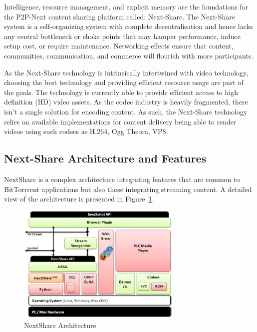 Intelligence, resource management, and explicit memory are the foundations for
the P2P-Next content sharing platform called: Next-Share. The Next-Share
system is a self-organizing system with complete decentralisation and hence
lacks any central bottleneck or choke points that may hamper performance,
induce setup cost, or require maintenance. Networking effects ensure that
content, communities, communication, and commerce will flourish with more
participants.

As the Next-Share technology is intrinsically intertwined with video technology,
choosing the best technology and providing efficient resource usage are part
of the goals. The technology is currently able to provide efficient access to
high definition (HD) video assets. As the codec industry is heavily
fragmented, there isn't a single solution for encoding content. As such, the
Next-Share technology relies on available implementations for content delivery
being able to render videos using such codecs as H.264, Ogg Theora, VP8.

\subsection{Next-Share Architecture and Features}
\label{subsec:multimedia-dist:nextshare-arch}

NextShare is a complex architecture integrating features that are common to
BitTorrrent applications but also those integrating streaming content. A
detailed view of the architecture is presented in
Figure~\ref{fig:multimedia-dist:nextshare-architecture}.

\begin{figure}
  \centering
  \includegraphics[width=0.7\textwidth]{src/img/multimedia-dist/nextshare-architecture}
  \caption{NextShare Architecture}
  \label{fig:multimedia-dist:nextshare-architecture}
\end{figure}

